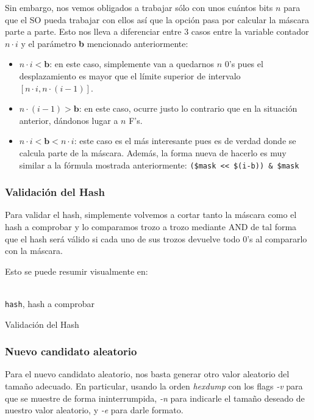 \documentclass[a4paper, 11pt]{article}
\begin{document}
			Sin embargo, nos vemos obligados a trabajar sólo con unos cuántos bits $n$ para que el SO pueda trabajar con ellos
			así que la opción pasa por calcular la máscara parte a parte. Esto nos lleva a diferenciar entre 3 casos entre
			la variable contador $n \cdot i$ y el parámetro \textbf{b} mencionado anteriormente:
			\begin{itemize}
				\item $n \cdot i < \textbf{b}$: en este caso, simplemente van a quedarnos $n$ 0's pues el desplazamiento es
				mayor que el límite superior de intervalo $[n \cdot i, n \cdot (i-1)]$.
				\item $n \cdot (i-1) > \textbf{b}$: en este caso, ocurre justo lo contrario que en la situación anterior,
				dándonos lugar a $n$ F's.
				\item $n \cdot i < \textbf{b} < n \cdot i$: este caso es el más interesante pues es de verdad donde se
				calcula parte de la máscara. Además, la forma nueva de hacerlo es muy similar a la fórmula mostrada anteriormente:
				\verb|($mask << $(i-b)) & $mask|
			\end{itemize}
			
		\subsubsection{Validación del Hash}
			Para validar el hash, simplemente volvemos a cortar tanto la máscara como el hash a comprobar y lo comparamos
			trozo a trozo mediante AND de tal forma que el hash será válido si cada uno de sus trozos devuelve todo 0's al
			compararlo con la máscara.
			
			Esto se puede resumir visualmente en:
			\begin{algorithm}[H]
				\begin{algorithmic}[1]
					\REQUIRE \ \\
						\texttt{hash}, hash a comprobar \\
						\ENDIF
					\ENDFOR
				\end{algorithmic}
				\caption{Validación del Hash}
				\label{valid_Hash}
			\end{algorithm}
			
		\subsubsection{Nuevo candidato aleatorio}
			Para el nuevo candidato aleatorio, nos basta generar otro valor aleatorio del tamaño adecuado. En particular, usando
			la orden \textit{hexdump} con los flags \textit{-v} para que se muestre de forma ininterrumpida, \textit{-n} para
			indicarle el tamaño deseado de nuestro valor aleatorio, y \textit{-e} para darle formato.
		
\end{document}
